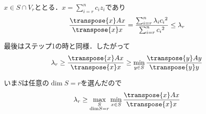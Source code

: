 $x\in S\cap V_r$ととる．$x=\displaystyle\sum_{i=r}^n c_i z_i$であり
\begin{equation*}
  \displaystyle\frac{\transpose{x}Ax}{\transpose{x}x}=\frac{\sum_{i=r}^n {\lambda}_i {c_i}^2}{\sum_{i=r}^n {c_i}^2}\leq {\lambda}_r
\end{equation*}

最後はステップ1の時と同様．したがって
\begin{equation*}
  {\lambda}_r \geq \displaystyle\frac{\transpose{x}Ax}{\transpose{x}x}\geq \min_{y\in S}\frac{\transpose{y}Ay}{\transpose{y}y}
\end{equation*}

いま$S$は任意の$\dim S=r$を選んだので
\begin{equation}
    {\lambda}_r \geq \max_{\substack{S\\ \text{dim}S=r}}\min_{x\in S}\frac{\transpose{x}Ax}{\transpose{x}x}
\end{equation}